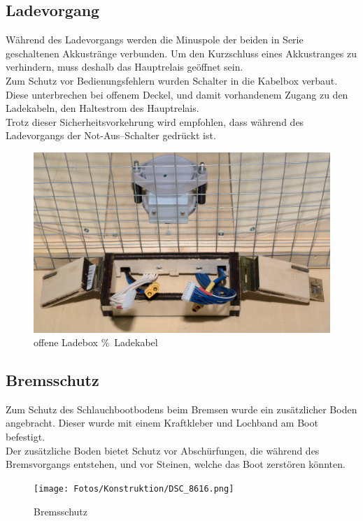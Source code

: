 \subsection{Ladevorgang}
Während des Ladevorgangs werden die Minuspole der beiden in Serie geschaltenen Akkustränge verbunden. Um den Kurzschluss eines Akkustranges zu verhindern, muss deshalb das Hauptrelais geöffnet sein.\\
Zum Schutz vor Bedienungsfehlern wurden Schalter in die Kabelbox verbaut. Diese unterbrechen bei offenem Deckel, und damit vorhandenem Zugang zu den Ladekabeln, den Haltestrom des Hauptrelais.\\
Trotz dieser Sicherheitsvorkehrung wird empfohlen, dass während des Ladevorgangs der Not-Aus--Schalter gedrückt ist.
\begin{figure}[H]
    \centering
    \includegraphics[width=\textwidth]{Fotos/Ladedeckel_DSC_8794.png}
    \caption{offene Ladebox \%\ Ladekabel}    
\end{figure}

\clearpage
\subsection{Bremsschutz}
Zum Schutz des Schlauchbootbodens beim Bremsen wurde ein zusätzlicher Boden angebracht. Dieser wurde mit einem Kraftkleber und Lochband am Boot befestigt.\\
Der zusätzliche Boden bietet Schutz vor Abschürfungen, die während des Bremsvorgangs entstehen, und vor Steinen, welche das Boot zerstören könnten.
\begin{figure}[H]
    \centering
    \texttt{[image: Fotos/Konstruktion/DSC\_8616.png]}
    \caption{Bremsschutz}    
\end{figure}

